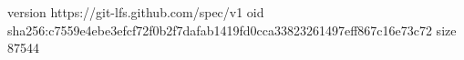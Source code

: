 version https://git-lfs.github.com/spec/v1
oid sha256:c7559e4ebe3efcf72f0b2f7dafab1419fd0cca33823261497eff867c16e73c72
size 87544
